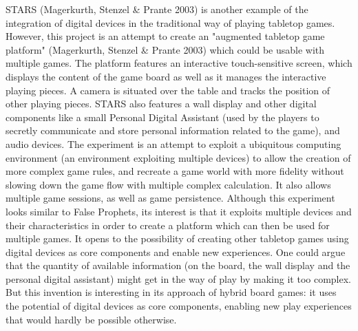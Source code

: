 STARS (Magerkurth, Stenzel \& Prante 2003) is another example of the integration of digital devices in the traditional way of playing tabletop games. However, this project is an attempt to create an "augmented tabletop game platform" (Magerkurth, Stenzel \& Prante 2003) which could be usable with multiple games. The platform features an interactive touch-sensitive screen, which displays the content of the game board as well as it manages the interactive playing pieces. A camera is situated over the table and tracks the position of other playing pieces. STARS also features a wall display and other digital components like a small Personal Digital Assistant (used by the players to secretly communicate and store personal information related to the game), and audio devices. The experiment is an attempt to exploit a ubiquitous computing environment (an environment exploiting multiple devices) to allow the creation of more complex game rules, and recreate a game world with more fidelity without slowing down the game flow with multiple complex calculation. It also allows multiple game sessions, as well as game persistence. Although this experiment looks similar to False Prophets, its interest is that it exploits multiple devices and their characteristics in order to create a platform which can then be used for multiple games. It opens to the possibility of creating other tabletop games using digital devices as core components and enable new experiences. One could argue that the quantity of available information (on the board, the wall display and the personal digital assistant) might get in the way of play by making it too complex. But this invention is interesting in its approach of hybrid board games: it uses the potential of digital devices as core components, enabling new play experiences that would hardly be possible otherwise.
